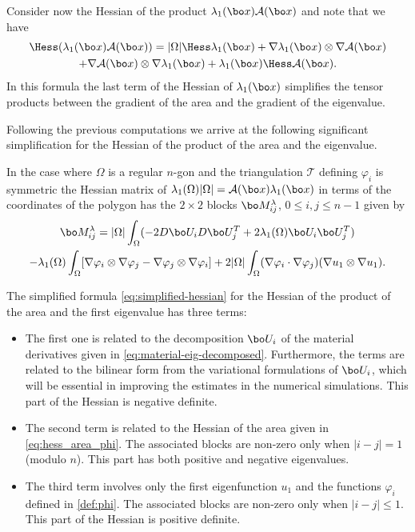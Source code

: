 Consider now the Hessian of the product $\lambda_1(\bo x)\mathcal A(\bo x)$ and note that we have
\vspace*{-5pt}
\begin{multline*}
\Hess (\lambda_1(\bo x)\mathcal A(\bo x)) = |\Omega|\Hess \lambda_1(\bo x)+\nabla \lambda_1(\bo x) \otimes \nabla \mathcal A(\bo x)\\ +
\nabla \mathcal A(\bo x)\otimes \nabla \lambda_1(\bo x) + \lambda_1 (\bo x) \Hess \mathcal A(\bo x).
\end{multline*}
In this formula the last term of the Hessian of $\lambda_1(\bo x)$ simplifies the tensor products between the gradient of the area and the gradient of the eigenvalue.

Following the previous computations we arrive at the following significant simplification for the Hessian of the product of the area and the eigenvalue.

\begin{propo}
In the case where $\Omega$ is a regular $n$-gon and the triangulation $\mathcal T$ defining $\varphi_i$ is symmetric the Hessian matrix of $\lambda_1(\Omega)|\Omega|= \mathcal A(\bo x) \lambda_1(\bo x)$ in terms of the coordinates of the polygon has the $2\times 2$ blocks $\bo M_{ij}^\lambda$, $0\leq i,j \leq n-1$ given by
\vspace*{-7pt}\enlargethispage{.5\baselineskip}
\begin{multline}
\label{eq:simplified-hessian}
\bo M_{ij}^\lambda = |\Omega|\int_\Omega (-2D\bo U_i D\bo U_j^T+ 2\lambda_1(\Omega)\bo U_i\bo U_j^T) \\
 -\lambda_1(\Omega)\int_\Omega [ \nabla \varphi_i \otimes \nabla \varphi_j - \nabla \varphi_j \otimes \nabla \varphi_i]+2|\Omega|\int_\Omega (\nabla \varphi_i \cdot \nabla \varphi_j)(\nabla u_1 \otimes \nabla u_1) .
\end{multline}
\end{propo}

The simplified formula \eqref{eq:simplified-hessian} for the Hessian of the product of the area and the first eigenvalue has three terms:
\begin{itemize}
\item The first one is related to the decomposition $\bo U_i$ of the material derivatives given in \eqref{eq:material-eig-decomposed}. Furthermore, the terms are related to the bilinear form from the variational formulations of $\bo U_i$, which will be essential in improving the estimates in the numerical simulations. This part of the Hessian is negative definite.
\item The second term is related to the Hessian of the area given in \eqref{eq:hess_area_phi}. The asso\-ciated blocks are non-zero only when $|i-j|=1$ (modulo $n$). This part has both positive and negative eigenvalues.
\item The third term involves only the first eigenfunction $u_1$ and the functions $\varphi_i$ defined in \eqref{def:phi}. The associated blocks are non-zero only when $|i-j|\leq 1$. This part of the Hessian is positive definite.
\end{itemize}

